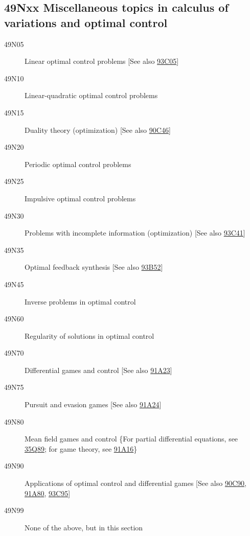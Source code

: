 \subsection*{49Nxx  Miscellaneous topics in calculus of variations and optimal control }\label{49Nxx}
\begin{description}  
\item [49N05]\label{49N05} Linear optimal control problems [See also \hyperref[93C05]{93C05}]
\item [49N10]\label{49N10} Linear-quadratic optimal control problems
\item [49N15]\label{49N15} Duality theory (optimization) [See also \hyperref[90C46]{90C46}]
\item [49N20]\label{49N20} Periodic optimal control problems
\item [49N25]\label{49N25} Impulsive optimal control problems
\item [49N30]\label{49N30} Problems with incomplete information (optimization) [See also \hyperref[93C41]{93C41}]
\item [49N35]\label{49N35} Optimal feedback synthesis [See also \hyperref[93B52]{93B52}]
\item [49N45]\label{49N45} Inverse problems in optimal control
\item [49N60]\label{49N60} Regularity of solutions in optimal control
\item [49N70]\label{49N70} Differential games and control [See also \hyperref[91A23]{91A23}]
\item [49N75]\label{49N75} Pursuit and evasion games [See also \hyperref[91A24]{91A24}]
\item [49N80]\label{49N80} Mean field games and control \{For partial differential equations, see \hyperref[35Q89]{35Q89}; for game theory, see \hyperref[91A16]{91A16}\}
\item [49N90]\label{49N90} Applications of optimal control and differential games [See also \hyperref[90C90]{90C90}, \hyperref[91A80]{91A80}, \hyperref[93C95]{93C95}]
\item [49N99]\label{49N99} None of the above, but in this section
\end{description}
